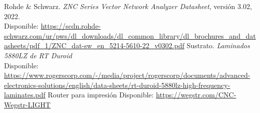 \documentclass[a4paper, 12pt]{article}
\begin{document}
\begin{thebibliography}{9} %
Rohde \& Schwarz. \textit{ZNC Series Vector Network Analyzer Datasheet},
versión 3.02, 2022. \\
Disponible: \url{https://scdn.rohde-schwarz.com/ur/pws/dl_downloads/dl_common_library/dl_brochures_and_datasheets/pdf_1/ZNC_dat-sw_en_5214-5610-22_v0302.pdf}
Sustrato. \textit{Laminados 5880LZ de RT Duroid}\\
Disponible: \url{https://www.rogerscorp.com/-/media/project/rogerscorp/documents/advanced-electronics-solutions/english/data-sheets/rt-duroid-5880lz-high-frequency-laminates.pdf}
Router para impresión
Disponible: \url{https://wegstr.com/CNC-Wegstr-LIGHT}
\end{thebibliography}
\end{document}
